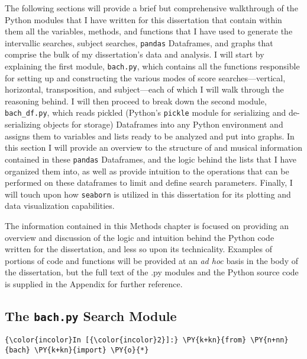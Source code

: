 The following sections will provide a brief but comprehensive
walkthrough of the Python modules that I have written for this
dissertation that contain within them all the variables, methods, and
functions that I have used to generate the intervallic searches, subject
searches, \texttt{pandas} Dataframes, and graphs that comprise the bulk
of my dissertation's data and analysis. I will start by explaining the
first module, \texttt{bach.py}, which contains all the functions
responsible for setting up and constructing the various modes of score
searches---vertical, horizontal, transposition, and
subject---each of which I will walk through the reasoning behind. I
will then proceed to break down the second module, \texttt{bach\_df.py},
which reads pickled (Python's \texttt{pickle} module for serializing and
de-serializing objects for storage) Dataframes into any Python
environment and assigns them to variables and lists ready to be analyzed
and put into graphs. In this section I will provide an overview to the
structure of and musical information contained in these \texttt{pandas}
Dataframes, and the logic behind the lists that I have organized them
into, as well as provide intuition to the operations that can be
performed on these dataframes to limit and define search parameters.
Finally, I will touch upon how \texttt{seaborn} is utilized in this
dissertation for its plotting and data visualization capabilities.

The information contained in this Methods chapter is focused on
providing an overview and discussion of the logic and intuition behind
the Python code written for the dissertation, and less so upon its
technicality. Examples of portions of code and functions will be
provided at an \emph{ad hoc} basis in the body of the dissertation, but
the full text of the .py modules and the Python source code is supplied
in the Appendix for further reference.

    \subsection{\texorpdfstring{The \texttt{bach.py} Search
Module}{The bach.py Search Module}}\label{the-bach.py-search-module}

    \begin{Verbatim}[commandchars=\\\{\}]
{\color{incolor}In [{\color{incolor}2}]:} \PY{k+kn}{from} \PY{n+nn}{bach} \PY{k+kn}{import} \PY{o}{*}
\end{Verbatim}


